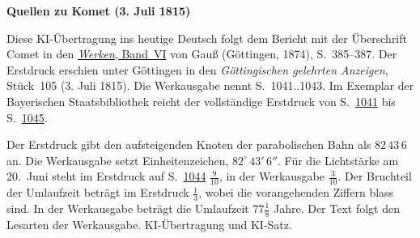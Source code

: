 \clearpage\thispagestyle{empty}
\begin{center}\textbf{Quellen zu Komet (3. Juli 1815)}\end{center}
\noindent Diese KI-Übertragung ins heutige Deutsch folgt dem Bericht mit der Überschrift Comet in den \href{https://gdz.sub.uni-goettingen.de/id/PPN236007467}{\textit{Werken}, Band~VI} von Gauß (Göttingen, 1874), S.~385--387. Der Erstdruck erschien unter Göttingen in den \textit{Göttingischen gelehrten Anzeigen}, Stück~105 (3. Juli 1815). Die Werkausgabe nennt S.~1041..1043. Im Exemplar der Bayerischen Staatsbibliothek reicht der vollständige Erstdruck von S.~\href{https://api.digitale-sammlungen.de/iiif/image/v2/bsb10538687_00367/full/1600,/0/default.jpg}{1041} bis S.~\href{https://api.digitale-sammlungen.de/iiif/image/v2/bsb10538687_00371/full/1600,/0/default.jpg}{1045}.
\par\smallskip\noindent Der Erstdruck gibt den aufsteigenden Knoten der parabolischen Bahn als $82\,43\,6$ an. Die Werkausgabe setzt Einheitenzeichen, $82^\circ\,43'\,6''$. Für die Lichtstärke am 20.~Juni steht im Erstdruck auf S.~\href{https://api.digitale-sammlungen.de/iiif/image/v2/bsb10538687_00370/full/1600,/0/default.jpg}{1044} $\frac{9}{10}$, in der Werkausgabe $\frac{3}{10}$. Der Bruchteil der Umlaufzeit beträgt im Erstdruck $\frac{1}{3}$, wobei die vorangehenden Ziffern blass sind. In der Werkausgabe beträgt die Umlaufzeit $77\frac{1}{8}$ Jahre. Der Text folgt den Lesarten der Werkausgabe. KI-Übertragung und KI-Satz.
\clearpage

